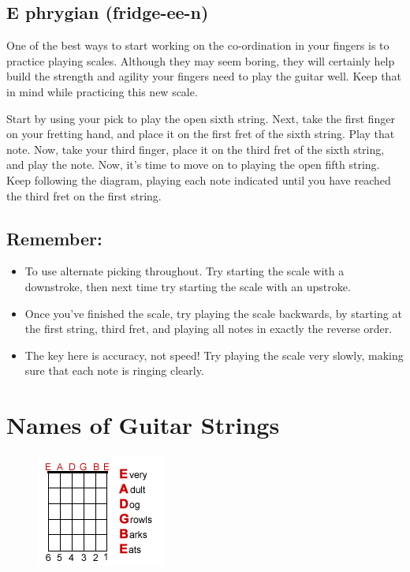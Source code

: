 \subsection{E phrygian (fridge-ee-n)}

One of the best ways to start working on the co-ordination in your fingers is
to practice playing scales. Although they may seem boring, they will certainly
help build the strength and agility your fingers need to play the guitar well.
Keep that in mind while practicing this new scale.

Start by using your pick to play the open sixth string. Next, take the first
finger on your fretting hand, and place it on the first fret of the sixth
string. Play that note. Now, take your third finger, place it on the third fret
of the sixth string, and play the note. Now, it's time to move on to playing
the open fifth string. Keep following the diagram, playing each note indicated
until you have reached the third fret on the first string.

\subsection{Remember:}
%
\begin{itemize}
\item To use alternate picking throughout. Try starting the scale with a
      downstroke, then next time try starting the scale with an upstroke.
\item Once you've finished the scale, try playing the scale backwards, by
      starting at the first string, third fret, and playing all notes in exactly the
      reverse order.
\item The key here is accuracy, not speed! Try playing the scale very slowly,
      making sure that each note is ringing clearly.
\end{itemize}

\section{Names of Guitar Strings}
\begin{figure}
\includegraphics{parttwo/openstrings.png}
\end{figure}

